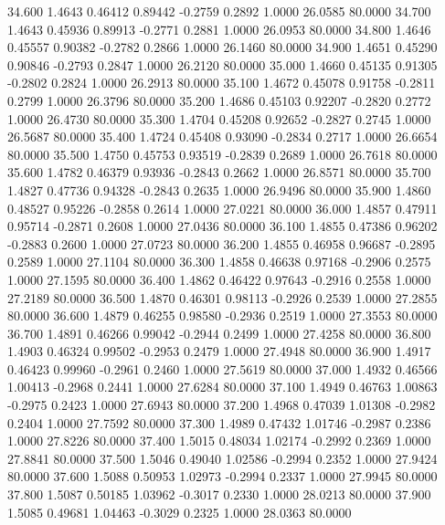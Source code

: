   34.600   1.4643   0.46412   0.89442  -0.2759   0.2892   1.0000  26.0585  80.0000
  34.700   1.4643   0.45936   0.89913  -0.2771   0.2881   1.0000  26.0953  80.0000
  34.800   1.4646   0.45557   0.90382  -0.2782   0.2866   1.0000  26.1460  80.0000
  34.900   1.4651   0.45290   0.90846  -0.2793   0.2847   1.0000  26.2120  80.0000
  35.000   1.4660   0.45135   0.91305  -0.2802   0.2824   1.0000  26.2913  80.0000
  35.100   1.4672   0.45078   0.91758  -0.2811   0.2799   1.0000  26.3796  80.0000
  35.200   1.4686   0.45103   0.92207  -0.2820   0.2772   1.0000  26.4730  80.0000
  35.300   1.4704   0.45208   0.92652  -0.2827   0.2745   1.0000  26.5687  80.0000
  35.400   1.4724   0.45408   0.93090  -0.2834   0.2717   1.0000  26.6654  80.0000
  35.500   1.4750   0.45753   0.93519  -0.2839   0.2689   1.0000  26.7618  80.0000
  35.600   1.4782   0.46379   0.93936  -0.2843   0.2662   1.0000  26.8571  80.0000
  35.700   1.4827   0.47736   0.94328  -0.2843   0.2635   1.0000  26.9496  80.0000
  35.900   1.4860   0.48527   0.95226  -0.2858   0.2614   1.0000  27.0221  80.0000
  36.000   1.4857   0.47911   0.95714  -0.2871   0.2608   1.0000  27.0436  80.0000
  36.100   1.4855   0.47386   0.96202  -0.2883   0.2600   1.0000  27.0723  80.0000
  36.200   1.4855   0.46958   0.96687  -0.2895   0.2589   1.0000  27.1104  80.0000
  36.300   1.4858   0.46638   0.97168  -0.2906   0.2575   1.0000  27.1595  80.0000
  36.400   1.4862   0.46422   0.97643  -0.2916   0.2558   1.0000  27.2189  80.0000
  36.500   1.4870   0.46301   0.98113  -0.2926   0.2539   1.0000  27.2855  80.0000
  36.600   1.4879   0.46255   0.98580  -0.2936   0.2519   1.0000  27.3553  80.0000
  36.700   1.4891   0.46266   0.99042  -0.2944   0.2499   1.0000  27.4258  80.0000
  36.800   1.4903   0.46324   0.99502  -0.2953   0.2479   1.0000  27.4948  80.0000
  36.900   1.4917   0.46423   0.99960  -0.2961   0.2460   1.0000  27.5619  80.0000
  37.000   1.4932   0.46566   1.00413  -0.2968   0.2441   1.0000  27.6284  80.0000
  37.100   1.4949   0.46763   1.00863  -0.2975   0.2423   1.0000  27.6943  80.0000
  37.200   1.4968   0.47039   1.01308  -0.2982   0.2404   1.0000  27.7592  80.0000
  37.300   1.4989   0.47432   1.01746  -0.2987   0.2386   1.0000  27.8226  80.0000
  37.400   1.5015   0.48034   1.02174  -0.2992   0.2369   1.0000  27.8841  80.0000
  37.500   1.5046   0.49040   1.02586  -0.2994   0.2352   1.0000  27.9424  80.0000
  37.600   1.5088   0.50953   1.02973  -0.2994   0.2337   1.0000  27.9945  80.0000
  37.800   1.5087   0.50185   1.03962  -0.3017   0.2330   1.0000  28.0213  80.0000
  37.900   1.5085   0.49681   1.04463  -0.3029   0.2325   1.0000  28.0363  80.0000
